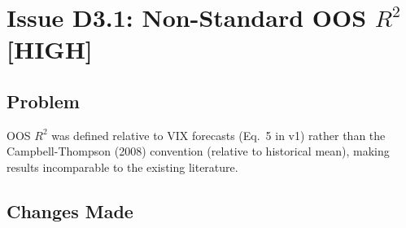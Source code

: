\documentclass[12pt,a4paper]{article}
\begin{document}
\section{Issue D3.1: Non-Standard OOS $R^2$ [HIGH]}

\subsection*{Problem}
OOS $R^2$ was defined relative to VIX forecasts (Eq.\ 5 in v1) rather than the Campbell-Thompson (2008) convention (relative to historical mean), making results incomparable to the existing literature.

\subsection*{Changes Made}
\end{document}
